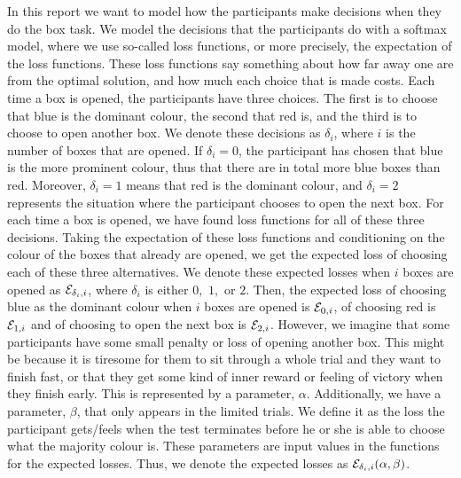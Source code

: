 In this report we want to model how the participants make decisions when they do the box task. We model the decisions that the participants do with a softmax model, where we use so-called loss functions, or more precisely, the expectation of the loss functions. These loss functions say something about how far away one are from the optimal solution, and how much each choice that is made costs. Each time a box is opened, the participants have three choices. The first is to choose that blue is the dominant colour, the second that red is, and the third is to choose to open another box. We denote these decisions as $\delta_i$, where $i$ is the number of boxes that are opened. If $\delta_i = 0$, the participant has chosen that blue is the more prominent colour, thus that there are in total more blue boxes than red. Moreover, $\delta_i=1$ means that red is the dominant colour, and $\delta_i=2$ represents the situation where the participant chooses to open the next box. For each time a box is opened, we have found loss functions for all of these three decisions. Taking the expectation of these loss functions and conditioning on the colour of the boxes that already are opened, we get the expected loss of choosing each of these three alternatives. We denote these expected losses when $i$ boxes are opened as $\mathcal{E}_{\delta_i,i}$, where $\delta_i$ is either $0,$ $1,$ or $2$. Then, the expected loss of choosing blue as the dominant colour when $i$ boxes are opened is $\mathcal{E}_{0,i}$, of choosing red is $\mathcal{E}_{1,i}$ and of choosing to open the next box is $\mathcal{E}_{2,i}$. However, we imagine that some participants have some small penalty or loss of opening another box. This might be because it is tiresome for them to sit through a whole trial and they want to finish fast, or that they get some kind of inner reward or feeling of victory when they finish early. This is represented by a parameter, $\alpha$. Additionally, we have a parameter, $\beta$, that only appears in the limited trials. 
We define it as the loss the participant gets/feels when the test terminates before he or she is able to choose what the majority colour is. These parameters are input values in the functions for the expected losses. Thus, we denote the expected losses as $\mathcal{E}_{\delta_i,i}(\alpha,\beta)$.


